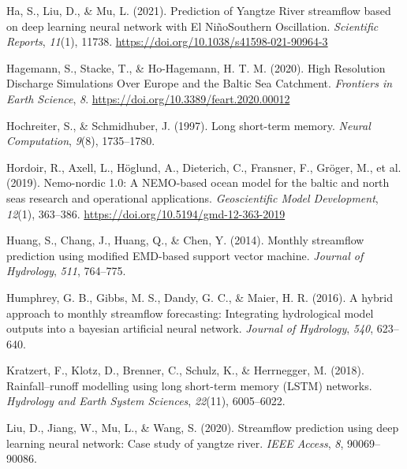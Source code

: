 \documentclass[
]{agujournal2019}
\newlength{\cslhangindent}
\newlength{\cslentryspacingunit} %
\newenvironment{CSLReferences}[2] %
 {%
  \setlength{\parindent}{0pt}
  \ifodd #1
  \let\oldpar\par
  \def\par{\hangindent=\cslhangindent\oldpar}
  \fi
  \setlength{\parskip}{#2\cslentryspacingunit}
 }%
 {}
\begin{document}
\begin{CSLReferences}{1}{0}
\leavevmode{}%
Ha, S., Liu, D., \& Mu, L. (2021). Prediction of Yangtze River
streamflow based on deep learning neural network with El
Niño{\textendash}Southern Oscillation. \emph{Scientific Reports},
\emph{11}(1), 11738. \url{https://doi.org/10.1038/s41598-021-90964-3}

\leavevmode{}%
Hagemann, S., Stacke, T., \& Ho-Hagemann, H. T. M. (2020). High
{Resolution Discharge Simulations Over Europe} and the {Baltic Sea
Catchment}. \emph{Frontiers in Earth Science}, \emph{8}.
\url{https://doi.org/10.3389/feart.2020.00012}

\leavevmode{}%
Hochreiter, S., \& Schmidhuber, J. (1997). Long short-term memory.
\emph{Neural Computation}, \emph{9}(8), 1735--1780.

\leavevmode{}%
Hordoir, R., Axell, L., Höglund, A., Dieterich, C., Fransner, F.,
Gröger, M., et al. (2019). Nemo-nordic 1.0: A NEMO-based ocean model for
the baltic and north seas {\textendash} research and operational
applications. \emph{Geoscientific Model Development}, \emph{12}(1),
363--386. \url{https://doi.org/10.5194/gmd-12-363-2019}

\leavevmode{}%
Huang, S., Chang, J., Huang, Q., \& Chen, Y. (2014). Monthly streamflow
prediction using modified EMD-based support vector machine.
\emph{Journal of Hydrology}, \emph{511}, 764--775.

\leavevmode{}%
Humphrey, G. B., Gibbs, M. S., Dandy, G. C., \& Maier, H. R. (2016). A
hybrid approach to monthly streamflow forecasting: Integrating
hydrological model outputs into a bayesian artificial neural network.
\emph{Journal of Hydrology}, \emph{540}, 623--640.

\leavevmode{}%
Kratzert, F., Klotz, D., Brenner, C., Schulz, K., \& Herrnegger, M.
(2018). Rainfall--runoff modelling using long short-term memory (LSTM)
networks. \emph{Hydrology and Earth System Sciences}, \emph{22}(11),
6005--6022.

\leavevmode{}%
Liu, D., Jiang, W., Mu, L., \& Wang, S. (2020). Streamflow prediction
using deep learning neural network: Case study of yangtze river.
\emph{IEEE Access}, \emph{8}, 90069--90086.


\end{CSLReferences}
\end{document}
